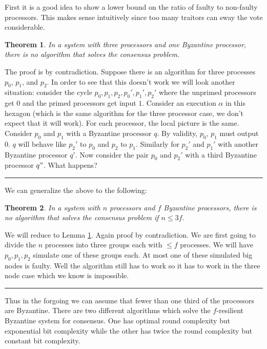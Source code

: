\documentclass[twoside]{article}
\newcounter{lecnum}
\newtheorem{theorem}{Theorem}[lecnum]
\newenvironment{proof}{{\bf Proof:}}{\hfill\rule{2mm}{2mm}}
\begin{document}
First it is a good idea to show a lower bound on the ratio of faulty to non-faulty processors. This makes sense intuitively since too many traitors can sway the vote considerable.

\begin{theorem}
\label{thm:threePoneB}
In a system with three processors and one Byzantine processor, there is no algorithm that solves the consensus problem.
\end{theorem}
\begin{proof}
The proof is by contradiction. Suppose there is an algorithm for three processes $p_0$, $p_1$, and $p_2$. In order to see that this doesn't work we will look another situation: consider the cycle $p_0, p_1, p_2, p_0', p_1', p_2'$ where the unprimed processors get $0$ and the primed processors get input $1$. Consider an execution $\alpha$ in this hexagon (which is the same algorithm for the three processor case, we don't expect that it will work). For each processor, the local picture is the same. Consider $p_0$ and $p_1$ with a Byzantine processor $q$. By validity, $p_0$, $p_1$ must output $0$. $q$ will behave like $p_2'$ to $p_0$ and $p_2$ to $p_1$. Similarly for $p_2'$ and $p_1'$ with another Byzantine processor $q'$. Now consider the pair $p_0$ and $p_2'$ with a third Byzantine processor $q"$. What happens?
\end{proof}

We can generalize the above to the following:
\begin{theorem}
\label{thm:threenPonenB}
In a system with $n$ processors and $f$ Byzantine processors, there is no algorithm that solves the consensus problem if $n \leq 3f$. 
\end{theorem}
\begin{proof}
We will reduce to Lemma \ref{thm:threePoneB}. Again proof by contradiction. We are first going to divide the $n$ processes into three groups each with $\leq f$ processes. We will have $p_0, p_1, p_2$ simulate one of these groups each. At most one of these simulated big nodes is faulty. Well the algorithm still has to work so it has to work in the three node case which we know is impossible.
\end{proof}

Thus in the forgoing we can assume that fewer than one third of the processors are Byzantine. There are two different algorithms which solve the $f$-resilient Byzantine system for consensus. One has optimal round complexity but exponential bit complexity while the other has twice the round complexity but constant bit complexity.
\end{document}
